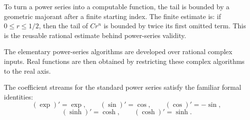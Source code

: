 \begin{definition}
\label{def:power-series-geometric-majorant}
To turn a power series into a computable function, the tail is bounded by a
geometric majorant after a finite starting index.  The finite estimate is:
if \(0\le r\le 1/2\), then the tail of \(Cr^n\) is bounded by twice its first
omitted term.  This is the reusable rational estimate behind power-series
validity.
\end{definition}

\begin{definition}
\label{def:complex-power-series-evaluators}
The elementary power-series algorithms are developed over rational complex
inputs.  Real functions are then obtained by restricting these complex
algorithms to the real axis.
\end{definition}

\begin{theorem}\label{thm:formal-derivative-table}
\leanok
The coefficient streams for the standard power series satisfy the familiar
formal identities:
\[
  (\exp)'=\exp,\qquad
  (\sin)'=\cos,\qquad
  (\cos)'=-\sin,
\]
\[
  (\sinh)'=\cosh,\qquad
  (\cosh)'=\sinh.
\]
\end{theorem}

